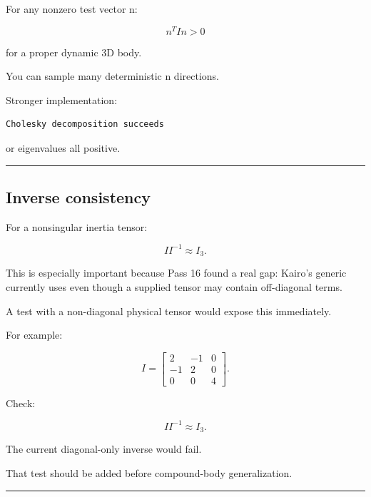 For any nonzero test vector n:

\[
\boxed{
n^TIn>0
}
\]

for a proper dynamic 3D body.

You can sample many deterministic n directions.

Stronger implementation:

\begin{verbatim}
Cholesky decomposition succeeds
\end{verbatim}

or eigenvalues all positive.

\begin{center}\rule{0.5\linewidth}{0.5pt}\end{center}

\subsection{Inverse consistency}\label{06-engine-ii-ch039-inverse-consistency}

\hypertarget{06-engine-ii-ch039-inverse-consistency}{}

For a nonsingular inertia tensor:

\[
\boxed{
II^{-1}\approx I_3.
}
\]

This is especially important because Pass 16 found a real gap: Kairo's generic  currently uses  even though a supplied tensor may contain off-diagonal terms.

A test with a non-diagonal physical tensor would expose this immediately.

For example:

\[
I=
\begin{bmatrix}
2&-1&0\\
-1&2&0\\
0&0&4
\end{bmatrix}.
\]

Check:

\[
II^{-1}\approx I_3.
\]

The current diagonal-only inverse would fail.

That test should be added before compound-body generalization.

\begin{center}\rule{0.5\linewidth}{0.5pt}\end{center}

